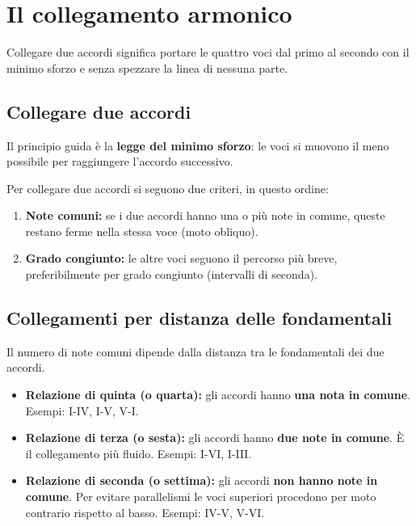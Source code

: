 \chapter{Il collegamento armonico}
\label{chap:collegamento}

Collegare due accordi significa portare le quattro voci dal primo al secondo con il minimo sforzo e senza spezzare la linea di nessuna parte.

\section{Collegare due accordi}
\label{sec:collegamento_armonico}

Il principio guida è la \textbf{legge del minimo sforzo}: le voci si muovono il meno possibile per raggiungere l'accordo successivo.

\begin{regola}
	\label{reg:minima_azione}
	Per collegare due accordi si seguono due criteri, in questo ordine:
	\begin{enumerate}
		\item \textbf{Note comuni:} se i due accordi hanno una o più note in comune, queste restano ferme nella stessa voce (moto obliquo).
		\item \textbf{Grado congiunto:} le altre voci seguono il percorso più breve, preferibilmente per grado congiunto (intervalli di seconda).
	\end{enumerate}
\end{regola}

\section{Collegamenti per distanza delle fondamentali}
\label{sec:collegamento_distanza}

Il numero di note comuni dipende dalla distanza tra le fondamentali dei due accordi.

\begin{itemize}
	\item \textbf{Relazione di quinta (o quarta):} gli accordi hanno \textbf{una nota in comune}. Esempi: I-IV, I-V, V-I.
	\item \textbf{Relazione di terza (o sesta):} gli accordi hanno \textbf{due note in comune}. È il collegamento più fluido. Esempi: I-VI, I-III.
	\item \textbf{Relazione di seconda (o settima):} gli accordi \textbf{non hanno note in comune}. Per evitare parallelismi le voci superiori procedono per moto contrario rispetto al basso. Esempi: IV-V, V-VI.
\end{itemize}


